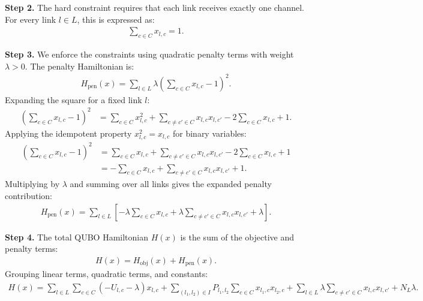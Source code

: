 \documentclass[12pt]{article}
\begin{document}
\textbf{Step 2.} The hard constraint requires that each link receives exactly one channel. For every link $l \in L$, this is expressed as:
\begin{align}
\sum_{c \in C} x_{l,c} = 1.
\end{align}

\textbf{Step 3.} We enforce the constraints using quadratic penalty terms with weight $\lambda > 0$. The penalty Hamiltonian is:
\begin{align}
H_{\text{pen}}(x) = \sum_{l \in L} \lambda \left( \sum_{c \in C} x_{l,c} - 1 \right)^2.
\end{align}
Expanding the square for a fixed link $l$:
\begin{align}
\left( \sum_{c \in C} x_{l,c} - 1 \right)^2 &= \sum_{c \in C} x_{l,c}^2 + \sum_{c \neq c' \in C} x_{l,c} x_{l,c'} - 2 \sum_{c \in C} x_{l,c} + 1.
\end{align}
Applying the idempotent property $x_{l,c}^2 = x_{l,c}$ for binary variables:
\begin{align}
\left( \sum_{c \in C} x_{l,c} - 1 \right)^2 &= \sum_{c \in C} x_{l,c} + \sum_{c \neq c' \in C} x_{l,c} x_{l,c'} - 2 \sum_{c \in C} x_{l,c} + 1 \\
&= -\sum_{c \in C} x_{l,c} + \sum_{c \neq c' \in C} x_{l,c} x_{l,c'} + 1.
\end{align}
Multiplying by $\lambda$ and summing over all links gives the expanded penalty contribution:
\begin{align}
H_{\text{pen}}(x) = \sum_{l \in L} \left[ -\lambda \sum_{c \in C} x_{l,c} + \lambda \sum_{c \neq c' \in C} x_{l,c} x_{l,c'} + \lambda \right].
\end{align}

\textbf{Step 4.} The total QUBO Hamiltonian $H(x)$ is the sum of the objective and penalty terms:
\begin{align}
H(x) = H_{\text{obj}}(x) + H_{\text{pen}}(x).
\end{align}
Grouping linear terms, quadratic terms, and constants:
\begin{align}
H(x) = \sum_{l \in L} \sum_{c \in C} (-U_{l,c} - \lambda) x_{l,c} + \sum_{(l_1, l_2) \in I} P_{l_1, l_2} \sum_{c \in C} x_{l_1,c} x_{l_2,c} + \sum_{l \in L} \lambda \sum_{c \neq c' \in C} x_{l,c} x_{l,c'} + N_L \lambda.
\end{align}
\end{document}

